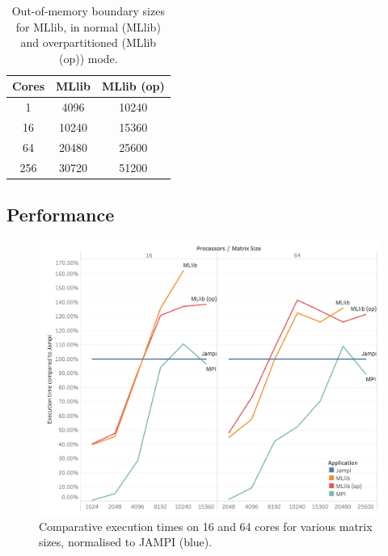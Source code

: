 \documentclass[fleqn,10pt]{SelfArx} %
\begin{document}
\begin{table}
	\centering
	\begin{tabular}{ |c|c|c| } 
	 \hline
	 Cores & MLlib & MLlib (op)  \\ 
	 \hline\hline
	 1 & 4096 & 10240 \\ 
	 \hline
	 16 & 10240 & 15360 \\ 
	 \hline
	 64 & 20480 & 25600 \\ 
	 \hline
	 256 & 30720 & 51200 \\ 
	 \hline
	\end{tabular}
	\caption{Out-of-memory boundary sizes for MLlib, in normal (MLlib) and overpartitioned (MLlib (op)) mode.}
	\label{tab:out_of_memory}
\end{table}
	

\subsection{Performance} %
\label{sub:performance}


\begin{figure}
	\centering
	\includegraphics[width=0.9\linewidth]{compared_to_jampi}
	\vspace{14pt}
	\caption{Comparative execution times on 16 and 64 cores for various matrix sizes, normalised to JAMPI (blue).}
	\label{fig:comparison_to_jampi}
\end{figure}


\end{document}
